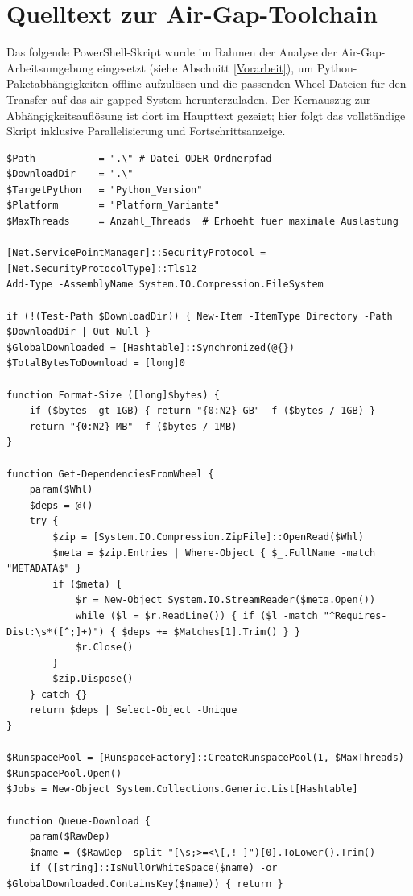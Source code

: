 \section{Quelltext zur Air-Gap-Toolchain}

Das folgende PowerShell-Skript wurde im Rahmen der Analyse der Air-Gap-Arbeitsumgebung eingesetzt (siehe Abschnitt \ref{Vorarbeit}), um Python-Paketabhängigkeiten offline aufzulösen und die passenden Wheel-Dateien für den Transfer auf das air-gapped System herunterzuladen. Der Kernauszug zur Abhängigkeitsauflösung ist dort im Haupttext gezeigt; hier folgt das vollständige Skript inklusive Parallelisierung und Fortschrittsanzeige.

\begin{lstlisting}[caption=Vollständiges Powershell-Skript zum Download von Wheel-Dateien, label=lst:powershell]
$Path           = ".\" # Datei ODER Ordnerpfad
$DownloadDir    = ".\"
$TargetPython   = "Python_Version"
$Platform       = "Platform_Variante"
$MaxThreads     = Anzahl_Threads  # Erhoeht fuer maximale Auslastung

[Net.ServicePointManager]::SecurityProtocol = [Net.SecurityProtocolType]::Tls12
Add-Type -AssemblyName System.IO.Compression.FileSystem

if (!(Test-Path $DownloadDir)) { New-Item -ItemType Directory -Path $DownloadDir | Out-Null }
$GlobalDownloaded = [Hashtable]::Synchronized(@{})
$TotalBytesToDownload = [long]0

function Format-Size ([long]$bytes) {
    if ($bytes -gt 1GB) { return "{0:N2} GB" -f ($bytes / 1GB) }
    return "{0:N2} MB" -f ($bytes / 1MB)
}

function Get-DependenciesFromWheel {
    param($Whl)
    $deps = @()
    try {
        $zip = [System.IO.Compression.ZipFile]::OpenRead($Whl)
        $meta = $zip.Entries | Where-Object { $_.FullName -match "METADATA$" }
        if ($meta) {
            $r = New-Object System.IO.StreamReader($meta.Open())
            while ($l = $r.ReadLine()) { if ($l -match "^Requires-Dist:\s*([^;]+)") { $deps += $Matches[1].Trim() } }
            $r.Close()
        }
        $zip.Dispose()
    } catch {}
    return $deps | Select-Object -Unique
}

$RunspacePool = [RunspaceFactory]::CreateRunspacePool(1, $MaxThreads)
$RunspacePool.Open()
$Jobs = New-Object System.Collections.Generic.List[Hashtable]

function Queue-Download {
    param($RawDep)
    $name = ($RawDep -split "[\s;>=<\[,! ]")[0].ToLower().Trim()
    if ([string]::IsNullOrWhiteSpace($name) -or $GlobalDownloaded.ContainsKey($name)) { return }


\end{lstlisting}
